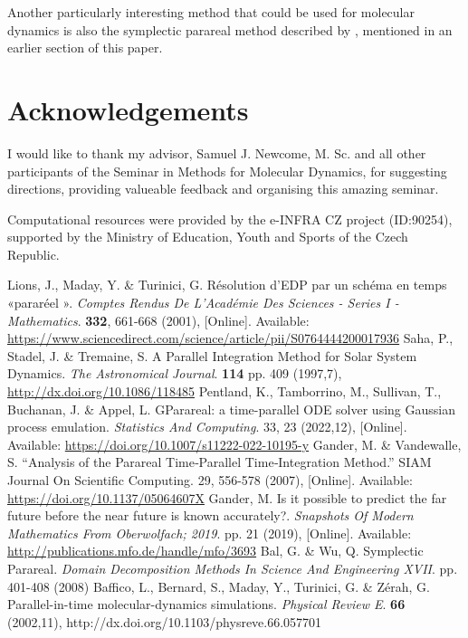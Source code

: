 \documentclass[conference]{IEEEtran}
\begin{document}
Another particularly interesting method that could be used for molecular dynamics is also the symplectic parareal method described by \cite{symplecticparareal}, mentioned in an earlier section of this paper.

\section*{Acknowledgements}

I would like to thank my advisor, Samuel J. Newcome, M. Sc. and all other participants of the Seminar in Methods for Molecular Dynamics, for suggesting directions, providing valueable feedback and organising this amazing seminar.

Computational resources were provided by the e-INFRA CZ project (ID:90254),
supported by the Ministry of Education, Youth and Sports of the Czech Republic.

\begin{thebibliography}{00}
Lions, J., Maday, Y. \& Turinici, G. Résolution d'EDP par un schéma en temps «pararéel ». {\em Comptes Rendus De L'Académie Des Sciences - Series I - Mathematics}. \textbf{332}, 661-668 (2001), [Online]. Available: \url{https://www.sciencedirect.com/science/article/pii/S0764444200017936}
Saha, P., Stadel, J. \& Tremaine, S. A Parallel Integration Method for Solar System Dynamics. {\em The Astronomical Journal}. \textbf{114} pp. 409 (1997,7), \url{http://dx.doi.org/10.1086/118485}
Pentland, K., Tamborrino, M., Sullivan, T., Buchanan, J. \& Appel, L. GParareal: a time-parallel ODE solver using Gaussian process emulation. {\em Statistics And Computing}. 33, 23 (2022,12), [Online]. Available: \url{https://doi.org/10.1007/s11222-022-10195-y}
Gander, M. \& Vandewalle, S. ``Analysis of the Parareal Time‐Parallel Time‐Integration Method.'' SIAM Journal On Scientific Computing. 29, 556-578 (2007), [Online]. Available: \url{https://doi.org/10.1137/05064607X}
Gander, M. Is it possible to predict the far future before the near future is known accurately?. {\em Snapshots Of Modern Mathematics From Oberwolfach; 2019}. pp. 21 (2019), [Online]. Available: \url{http://publications.mfo.de/handle/mfo/3693}
Bal, G. \& Wu, Q. Symplectic Parareal. {\em Domain Decomposition Methods In Science And Engineering XVII}. pp. 401-408 (2008)
Baffico, L., Bernard, S., Maday, Y., Turinici, G. \& Zérah, G. Parallel-in-time molecular-dynamics simulations. {\em Physical Review E}. \textbf{66} (2002,11), http://dx.doi.org/10.1103/physreve.66.057701

\end{thebibliography}
\end{document}
